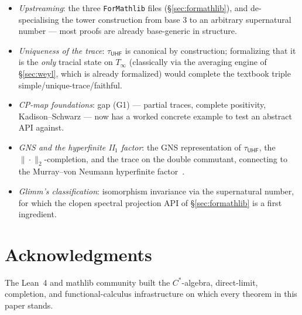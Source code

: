 \documentclass[11pt,a4paper]{amsart}
\theoremstyle{plain}
\theoremstyle{definition}
\newcommand{\Tinf}{T_\infty}
\newcommand{\tuhf}{\tau_{\mathsf{UHF}}}
\begin{document}
\begin{itemize}[itemsep=2pt]
\item \emph{Upstreaming}: the three \texttt{ForMathlib} files
  (\S\ref{sec:formathlib}), and de-specialising the tower construction
  from base 3 to an arbitrary supernatural number --- most proofs are
  already base-generic in structure.
\item \emph{Uniqueness of the trace}: $\tuhf$ is canonical by
  construction; formalizing that it is the \emph{only} tracial state on
  $\Tinf$ (classically via the averaging engine of \S\ref{sec:weyl},
  which is already formalized) would complete the textbook triple
  simple/unique-trace/faithful.
\item \emph{CP-map foundations}: gap (G1) --- partial traces, complete
  positivity, Kadison--Schwarz --- now has a worked concrete example to
  test an abstract API against.
\item \emph{GNS and the hyperfinite II$_1$ factor}: the GNS
  representation of $\tuhf$, the $\|\cdot\|_2$-completion, and the trace
  on the double commutant, connecting to the Murray--von Neumann
  hyperfinite factor~\cite{murray-vonneumann1936, powers1967}.
\item \emph{Glimm's classification}: isomorphism invariance via the
  supernatural number, for which the clopen spectral projection API of
  \S\ref{sec:formathlib} is a first ingredient.
\end{itemize}

\section*{Acknowledgments}

The Lean~4 and mathlib community built the $C^*$-algebra, direct-limit,
completion, and functional-calculus infrastructure on which every theorem
in this paper stands.
\end{document}
